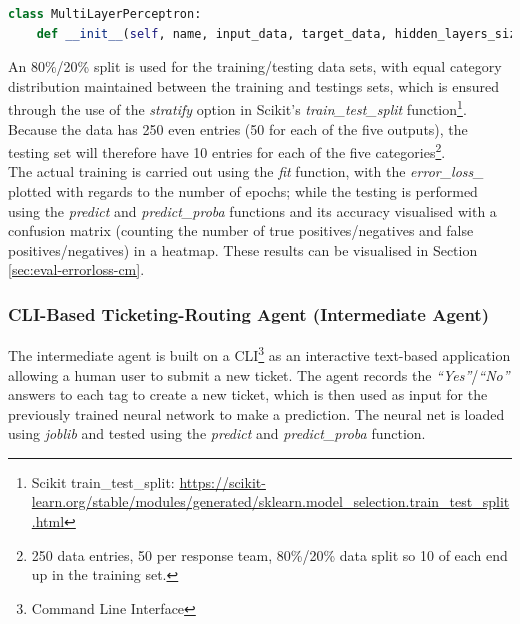 \documentclass[letterpaper,12pt]{article}
\begin{document}
\begin{lstlisting}[language=Python]
class MultiLayerPerceptron:
    def __init__(self, name, input_data, target_data, hidden_layers_size=(15,), solver="adam", activation_function="logistic", learning_rate_init=0.6, momentum=0.9, optimisation_tolerance=0.0001, num_iterations_no_change=1000, max_iterations=10000, verbose=config.debug):
\end{lstlisting}

An 80\%/20\% split is used for the training/testing data sets, with equal category distribution maintained between the training and testings sets, which is ensured through the use of the \textit{stratify} option in Scikit's \textit{train\_test\_split} function\footnote{Scikit train\_test\_split: \url{https://scikit-learn.org/stable/modules/generated/sklearn.model_selection.train_test_split.html}}. Because the data has 250 even entries (50 for each of the five outputs), the testing set will therefore have 10 entries for each of the five categories\footnote{250 data entries, 50 per response team, 80\%/20\% data split so 10 of each end up in the training set.}.\\

The actual training is carried out using the \textit{fit} function, with the \textit{error\_loss\_} plotted with regards to the number of epochs; while the testing is performed using the \textit{predict} and \textit{predict\_proba} functions and its accuracy visualised with a confusion matrix (counting the number of true positives/negatives and false positives/negatives) in a heatmap. These results can be visualised in Section \ref{sec:eval-errorloss-cm}.


\subsubsection{CLI-Based Ticketing-Routing Agent (Intermediate Agent)}

The intermediate agent is built on a CLI\footnote{Command Line Interface} as an interactive text-based application allowing a human user to submit a new ticket. The agent records the \textit{``Yes''}/\textit{``No''} answers to each tag to create a new ticket, which is then used as input for the previously trained neural network to make a prediction. The neural net is loaded using \textit{joblib} and tested using the \textit{predict} and \textit{predict\_proba} function.\\
\end{document}
